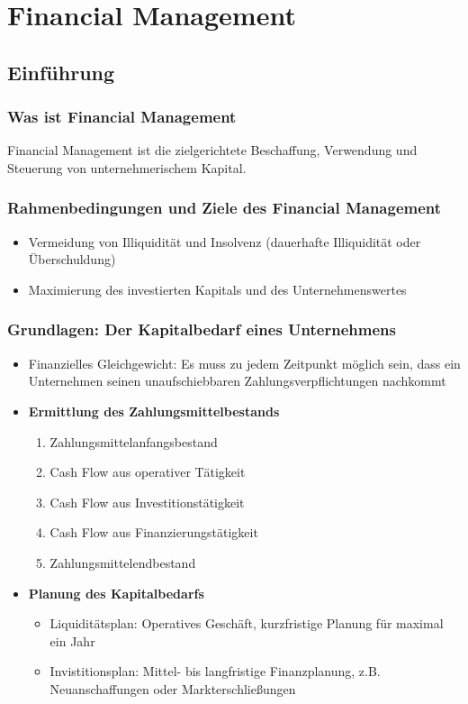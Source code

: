\chapter{Financial Management}

\section{Einführung}

\subsection{Was ist Financial Management}
Financial Management ist die zielgerichtete Beschaffung, Verwendung und Steuerung von unternehmerischem Kapital.


\subsection{Rahmenbedingungen und Ziele des Financial Management}
\begin{itemize}
	\item Vermeidung von Illiquidität und Insolvenz (dauerhafte Illiquidität oder Überschuldung)
	\item Maximierung des investierten Kapitals und des Unternehmenswertes
\end{itemize}


\subsection{Grundlagen: Der Kapitalbedarf eines Unternehmens}
\begin{itemize}
	\item Finanzielles Gleichgewicht: Es muss zu jedem Zeitpunkt möglich sein, dass ein Unternehmen seinen unaufschiebbaren Zahlungsverpflichtungen nachkommt
	\item \textbf{Ermittlung des Zahlungsmittelbestands}
	\begin{enumerate}
		\item Zahlungsmittelanfangsbestand
		\item Cash Flow aus operativer Tätigkeit
		\item Cash Flow aus Investitionstätigkeit
		\item Cash Flow aus Finanzierungstätigkeit
		\item Zahlungsmittelendbestand
	\end{enumerate}
	\item \textbf{Planung des Kapitalbedarfs}
	\begin{itemize}
		\item Liquiditätsplan: Operatives Geschäft, kurzfristige Planung für maximal ein Jahr
		\item Invistitionsplan: Mittel- bis langfristige Finanzplanung, z.B. Neuanschaffungen oder Markterschließungen
	\end{itemize}
\end{itemize}


